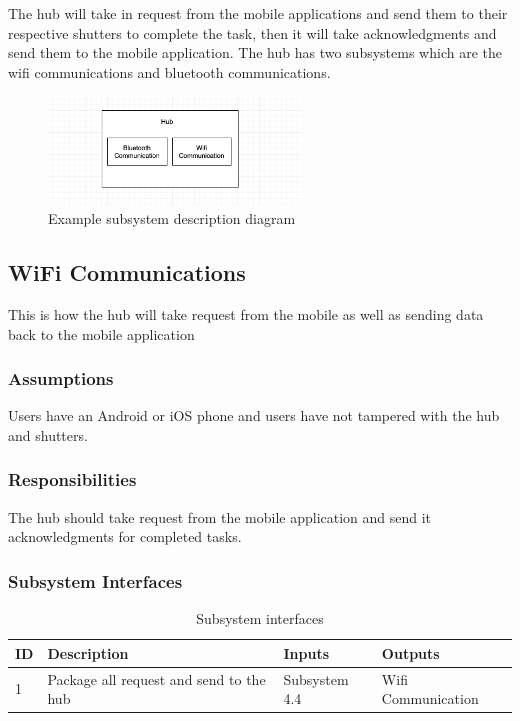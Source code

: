 The hub will take in request from the mobile applications and send them to their respective shutters to complete the task, then it will take acknowledgments and send them to the mobile application. The hub has two subsystems which are the wifi communications and bluetooth communications. 

\begin{figure}[h!]
	\centering
 	\includegraphics[width=0.60\textwidth]{images/Hub}
 \caption{Example subsystem description diagram}
\end{figure}

\subsection{WiFi Communications}
This is how the hub will take request from the mobile as well as sending data back to the mobile application

\subsubsection{Assumptions}
Users have an Android or iOS phone and users have not tampered with the hub and shutters.

\subsubsection{Responsibilities}
The hub should take request from the mobile application and send it acknowledgments for completed tasks.

\subsubsection{Subsystem Interfaces}
\begin {table}[H]
\caption {Subsystem interfaces} 
\begin{center}
    \begin{tabular}{ | p{1cm} | p{6cm} | p{3cm} | p{4cm} |}
    \hline
    ID & Description & Inputs & Outputs \\ \hline
    1 & Package all request and send to the hub & Subsystem 4.4 & Wifi Communication \\ \hline
    \end{tabular}
\end{center}
\end{table}

